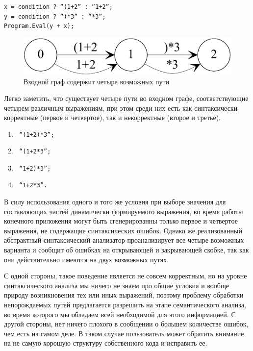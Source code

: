 \begin{verbatim}
x = condition ? “(1+2” : “1+2”;
y = condition ? “)*3” : “*3”;
Program.Eval(y + x);
\end{verbatim}

\begin{figure}[h]
 \label{instead}
 \centering
 \includegraphics[width=0.5\linewidth]{Verbitskaia/4insteadOf2.pdf}
 \caption{Входной граф содержит четыре возможных пути}
 \label{instead}
\end{figure}

Легко заметить, что существует четыре пути во входном графе, соответствующие 
четырем различным выражениям, при этом среди них есть как синтаксически-корректные 
(первое и четвертое), так и некорректные (второе и третье).

\begin{enumerate}
    \item \begin{verbatim} “(1+2)*3”; \end{verbatim}
    \item \begin{verbatim} “(1+2*3”; \end{verbatim}
    \item \begin{verbatim} “1+2)*3”; \end{verbatim}
    \item \begin{verbatim} “1+2*3”. \end{verbatim}
\end{enumerate}

В силу использования одного и того же условия при выборе значения для составляющих 
частей динамически формируемого выражения, во время работы конечного приложения 
могут быть сгенерированны только первое и четвертое выражения, не содержащие 
синтаксических ошибок. Однако же реализованный абстрактный синтаксический анализатор 
проанализирует все четыре возможных варианта и сообщит об ошибках на открывающей 
и закрывающей скобке, так как они действительно имеются на двух возможных путях. 

С одной стороны, такое поведение является не совсем корректным, но на уровне 
синтаксического анализа мы ничего не знаем про общие условия и вообще природу 
возникновения тех или иных выражений, поэтому проблему обработки непорождаемых 
путей предлагается разрешить на этапе семантического анализа, во время которого 
мы обладаем всей необходимой для этого информацией. С другой стороны, нет ничего 
плохого в сообщении о большем количестве ошибок, чем есть на самом деле. В таком 
случае пользователь может обратить внимание на не самую хорошую структуру 
собственного кода и исправить ее.

